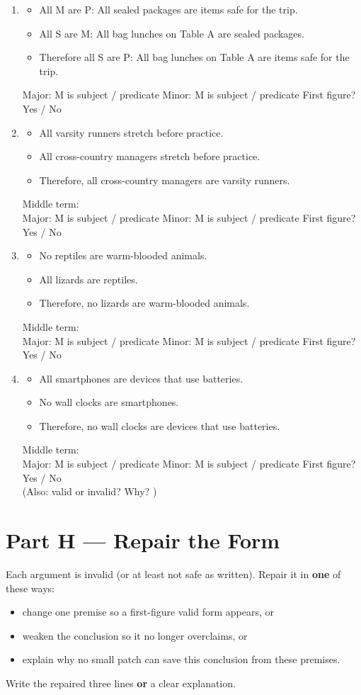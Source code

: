 \documentclass[11pt]{article}
\newcommand{\syllblock}[3]{%
\begin{itemize}[leftmargin=1.2em]
\item #1
\item #2
\item #3
\end{itemize}
}
\begin{document}
\begin{enumerate}
\item
\syllblock
{All M are P: All sealed packages are items safe for the trip.}
{All S are M: All bag lunches on Table A are sealed packages.}
{Therefore all S are P: All bag lunches on Table A are items safe for the trip.}
Major: M is subject / predicate \quad
Minor: M is subject / predicate \quad
First figure? Yes / No

\item
\syllblock
{All varsity runners stretch before practice.}
{All cross-country managers stretch before practice.}
{Therefore, all cross-country managers are varsity runners.}
Middle term: \underline{\hspace{2.6in}}\\
Major: M is subject / predicate \quad
Minor: M is subject / predicate \quad
First figure? Yes / No

\item
\syllblock
{No reptiles are warm-blooded animals.}
{All lizards are reptiles.}
{Therefore, no lizards are warm-blooded animals.}
Middle term: \underline{\hspace{2.6in}}\\
Major: M is subject / predicate \quad
Minor: M is subject / predicate \quad
First figure? Yes / No

\item
\syllblock
{All smartphones are devices that use batteries.}
{No wall clocks are smartphones.}
{Therefore, no wall clocks are devices that use batteries.}
Middle term: \underline{\hspace{2.6in}}\\
Major: M is subject / predicate \quad
Minor: M is subject / predicate \quad
First figure? Yes / No\\
(Also: valid or invalid? \underline{\hspace{1.2in}} Why? \underline{\hspace{2.4in}})
\end{enumerate}

\newpage
\section*{Part H --- Repair the Form}
\noindent Each argument is invalid (or at least not safe as written). Repair it in \textbf{one} of these ways:
\begin{itemize}
\item change one premise so a first-figure valid form appears, or
\item weaken the conclusion so it no longer overclaims, or
\item explain why no small patch can save this conclusion from these premises.
\end{itemize}
Write the repaired three lines \textbf{or} a clear explanation.
\end{document}
